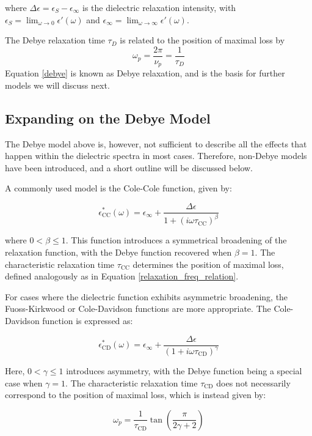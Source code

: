 where \( \Delta \epsilon = \epsilon_S - \epsilon_\infty \) is the dielectric relaxation intensity, with \( \epsilon_S = \lim_{\omega \to 0} \epsilon'(\omega) \) and \( \epsilon_\infty = \lim_{\omega \to \infty} \epsilon'(\omega) \).

The Debye relaxation time \( \tau_D \) is related to the position of maximal loss by
\begin{equation}
\omega_p = \frac{2\pi}{\nu_p} = \frac{1}{\tau_D}
\label{relaxation_freq_relation}
\end{equation}
Equation \ref{debye} is known as Debye relaxation, and is the basis for further models we will discuss next.
\subsection{Expanding on the Debye Model}
The Debye model above is, however, not sufficient to describe all the effects that happen within the dielectric spectra in most cases. Therefore, non-Debye models have been introduced, and a short outline will be discussed below.

A commonly used model is the Cole-Cole function, given by:

\[
\epsilon^*_{\text{CC}}(\omega) = \epsilon_\infty + \frac{\Delta \epsilon}{1 + (i \omega \tau_{\text{CC}})^\beta}
\]

where \( 0 < \beta \leq 1 \). This function introduces a symmetrical broadening of the relaxation function, with the Debye function recovered when \( \beta = 1 \). The characteristic relaxation time \( \tau_{\text{CC}} \) determines the position of maximal loss, defined analogously as in Equation \ref{relaxation_freq_relation}.



For cases where the dielectric function exhibits asymmetric broadening, the Fuoss-Kirkwood or Cole-Davidson functions are more appropriate. The Cole-Davidson function is expressed as:

\[
\epsilon^*_{\text{CD}}(\omega) = \epsilon_\infty + \frac{\Delta \epsilon}{(1 + i \omega \tau_{\text{CD}})^\gamma}
\]

Here, \( 0 < \gamma \leq 1 \) introduces asymmetry, with the Debye function being a special case when \( \gamma = 1 \). The characteristic relaxation time \( \tau_{\text{CD}} \) does not necessarily correspond to the position of maximal loss, which is instead given by:

\[
\omega_p = \frac{1}{\tau_{\text{CD}}} \tan\left(\frac{\pi}{2\gamma + 2}\right)
\]

